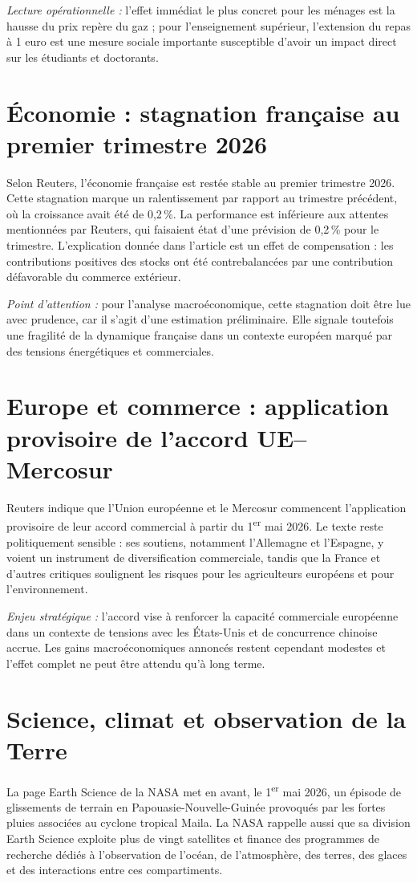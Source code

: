 \documentclass[11pt,a4paper]{article}
\begin{document}
\textit{Lecture opérationnelle :} l'effet immédiat le plus concret pour les ménages est la hausse du prix repère du gaz ; pour l'enseignement supérieur, l'extension du repas à 1 euro est une mesure sociale importante susceptible d'avoir un impact direct sur les étudiants et doctorants.

\section*{Économie : stagnation française au premier trimestre 2026}
Selon Reuters, l'économie française est restée stable au premier trimestre 2026. Cette stagnation marque un ralentissement par rapport au trimestre précédent, où la croissance avait été de 0,2\,\%. La performance est inférieure aux attentes mentionnées par Reuters, qui faisaient état d'une prévision de 0,2\,\% pour le trimestre. L'explication donnée dans l'article est un effet de compensation : les contributions positives des stocks ont été contrebalancées par une contribution défavorable du commerce extérieur.

\textit{Point d'attention :} pour l'analyse macroéconomique, cette stagnation doit être lue avec prudence, car il s'agit d'une estimation préliminaire. Elle signale toutefois une fragilité de la dynamique française dans un contexte européen marqué par des tensions énergétiques et commerciales.

\section*{Europe et commerce : application provisoire de l'accord UE--Mercosur}
Reuters indique que l'Union européenne et le Mercosur commencent l'application provisoire de leur accord commercial à partir du 1\textsuperscript{er} mai 2026. Le texte reste politiquement sensible : ses soutiens, notamment l'Allemagne et l'Espagne, y voient un instrument de diversification commerciale, tandis que la France et d'autres critiques soulignent les risques pour les agriculteurs européens et pour l'environnement.

\textit{Enjeu stratégique :} l'accord vise à renforcer la capacité commerciale européenne dans un contexte de tensions avec les États-Unis et de concurrence chinoise accrue. Les gains macroéconomiques annoncés restent cependant modestes et l'effet complet ne peut être attendu qu'à long terme.

\section*{Science, climat et observation de la Terre}
La page Earth Science de la NASA met en avant, le 1\textsuperscript{er} mai 2026, un épisode de glissements de terrain en Papouasie-Nouvelle-Guinée provoqués par les fortes pluies associées au cyclone tropical Maila. La NASA rappelle aussi que sa division Earth Science exploite plus de vingt satellites et finance des programmes de recherche dédiés à l'observation de l'océan, de l'atmosphère, des terres, des glaces et des interactions entre ces compartiments.
\end{document}
